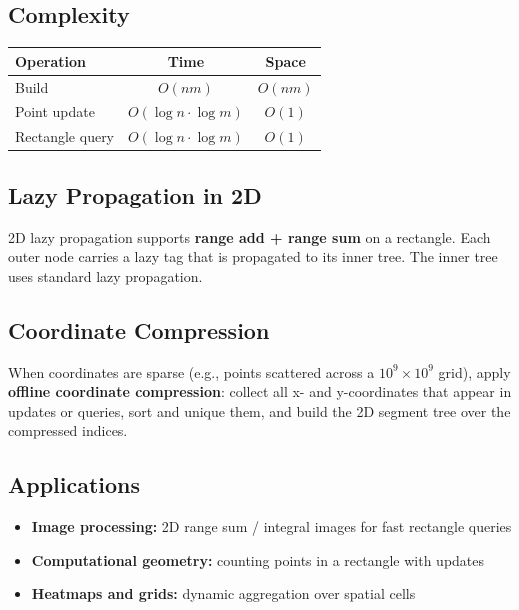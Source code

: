 \subsection{Complexity}

\begin{center}
\begin{tabular}{lcc}
\toprule
Operation & Time & Space \\
\midrule
Build & $O(nm)$ & $O(nm)$ \\
Point update & $O(\log n \cdot \log m)$ & $O(1)$ \\
Rectangle query & $O(\log n \cdot \log m)$ & $O(1)$ \\
\bottomrule
\end{tabular}
\end{center}

\subsection{Lazy Propagation in 2D}

2D lazy propagation supports \textbf{range add + range sum} on a rectangle. Each outer node carries a lazy tag that is propagated to its inner tree. The inner tree uses standard lazy propagation.

\subsection{Coordinate Compression}

When coordinates are sparse (e.g., points scattered across a $10^9 \times 10^9$ grid), apply \textbf{offline coordinate compression}: collect all x- and y-coordinates that appear in updates or queries, sort and unique them, and build the 2D segment tree over the compressed indices.

\subsection{Applications}

\begin{itemize}
    \item \textbf{Image processing:} 2D range sum / integral images for fast rectangle queries
    \item \textbf{Computational geometry:} counting points in a rectangle with updates
    \item \textbf{Heatmaps and grids:} dynamic aggregation over spatial cells
\end{itemize}

